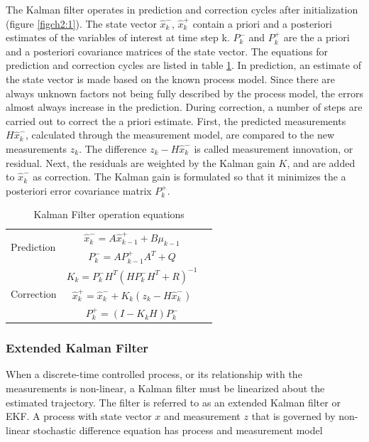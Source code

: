 The Kalman filter operates in prediction and correction cycles after
initialization (figure \ref{figch2:1}). The state vector
$\hat{x}^-_k$, $\hat{x}^+_k$ contain a priori and a posteriori
estimates of the variables of interest at time step k. $P^-_k$ and
$P^+_k$ are the a priori and a posteriori covariance matrices of the
state vector. The equations for prediction and correction cycles are
listed in table \ref{tab:KF}. In prediction, an estimate of the state
vector is made based on the known process model. Since there are
always unknown factors not being fully described by the process model,
the errors almost always increase in the prediction. During
correction, a number of steps are carried out to correct the a priori
estimate. First, the predicted measurements $H\hat{x}^-_k$, calculated
through the measurement model, are compared to the new measurements
$z_k$. The difference $z_k - H\hat{x}^-_k$ is called measurement
innovation, or residual. Next, the residuals are weighted by the
Kalman gain $K$, and are added to $\hat{x}^-_k$ as correction. The
Kalman gain is formulated so that it minimizes the a posteriori error
covariance matrix $P^+_k$.

\begin{table}
\caption{Kalman Filter operation equations}
\label{tab:KF}
\centering
\begin{tabular}{|l|c r|}
\hline
\multirow{2}{*}{Prediction} 
& $\hat{x}^-_k=A\hat{x}^+_{k-1}+B\mu_{k-1}$ & \stepcounter{equation}\thetag{\theequation}\\
& $P^-_k = AP^+_{k-1}A^T+Q$ & \stepcounter{equation}\thetag{\theequation}\\
\hline
\multirow{3}{*}{Correction}
& $K_k=P^-_kH^T(HP^-_kH^T+R)^{-1}$  & \stepcounter{equation}\thetag{\theequation}\\
& $\hat{x}^+_k = \hat{x}^-_k+K_k(z_k-H\hat{x}^-_k)$ & \stepcounter{equation}\thetag{\theequation}\\
& $P^+_k = (I-K_kH)P^-_k$ & \stepcounter{equation}\thetag{\theequation}\\
\hline
\end{tabular}
\end{table}
\FloatBarrier

\subsubsection{Extended Kalman Filter}
When a discrete-time controlled process, or its relationship with the
measurements is non-linear, a Kalman filter must be linearized about
the estimated trajectory. The filter is referred to as an extended
Kalman filter or EKF. A process with state vector $x$ and measurement
$z$ that is governed by non-linear stochastic difference equation has
process and measurement model

